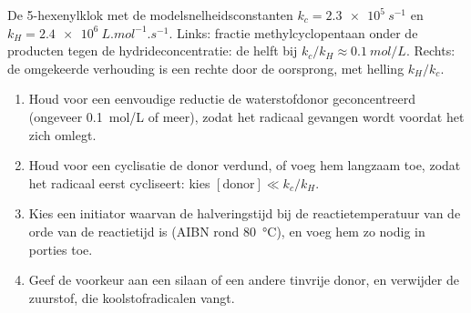 \begin{omfigure}

{\small De 5-hexenylklok met de modelsnelheidsconstanten $k_c = \qty{2.3e5}{s^{-1}}$ en
$k_H = \qty{2.4e6}{L.mol^{-1}.s^{-1}}$. Links: fractie methylcyclopentaan onder de producten tegen de
hydrideconcentratie: de helft bij $k_c/k_H \approx \qty{0.1}{mol/L}$. Rechts: de omgekeerde verhouding is een rechte
door de oorsprong, met helling $k_H/k_c$.}
\end{omfigure}

\begin{method}\label{met:b3:radicals-carbenes:radical-chain}
\begin{enumerate}
  \item Houd voor een eenvoudige reductie de waterstofdonor geconcentreerd
        (ongeveer
        \qty{0.1}{mol/L} of meer), zodat het radicaal gevangen wordt voordat het zich omlegt.
  \item Houd voor een cyclisatie de donor verdund, of voeg hem langzaam
        toe, zodat het radicaal eerst cycliseert: kies $[\text{donor}] \ll k_c/k_H$.
  \item Kies een initiator waarvan de halveringstijd bij de
        reactietemperatuur van de orde van de reactietijd is (AIBN rond \qty{80}{\celsius}), en voeg hem zo
        nodig in porties toe.
  \item Geef de voorkeur aan een silaan of een andere tinvrije donor, en
        verwijder de zuurstof, die koolstofradicalen vangt.
\end{enumerate}
\end{method}

